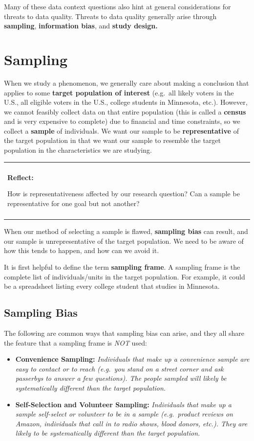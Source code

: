 \documentclass[
]{book}
\newenvironment{reflect}
{
    \begin{center}
    
    \begin{tabular}{|p{0.8\textwidth}|}
    \rowcolor{LightBlue}
    \hline\\
    \rowcolor{LightBlue}
    \textbf{Reflect:}
}
{
    \\\rowcolor{LightBlue}
    \\\hline
    \end{tabular} 
    \end{center}
}
\begin{document}
Many of these data context questions also hint at general considerations for threats to data quality. Threats to data quality generally arise through \textbf{sampling}, \textbf{information bias}, and \textbf{study design.}

\hypertarget{sampling}{%
\section{Sampling}\label{sampling}}

When we study a phenomenon, we generally care about making a conclusion that applies to some \textbf{target population of interest} (e.g.~all likely voters in the U.S., all eligible voters in the U.S., college students in Minnesota, etc.). However, we cannot feasibly collect data on that entire population (this is called a \textbf{census} and is very expensive to complete) due to financial and time constraints, so we collect a \textbf{sample} of individuals. We want our sample to be \textbf{representative} of the target population in that we want our sample to resemble the target population in the characteristics we are studying.

\begin{reflect}
How is representativeness affected by our research question? Can a
sample be representative for one goal but not another?
\end{reflect}

When our method of selecting a sample is flawed, \textbf{sampling bias} can result, and our sample is unrepresentative of the target population. We need to be aware of how this tends to happen, and how can we avoid it.

It is first helpful to define the term \textbf{sampling frame}. A sampling frame is the complete list of individuals/units in the target population. For example, it could be a spreadsheet listing every college student that studies in Minnesota.

\hypertarget{sampling-bias}{%
\subsection{Sampling Bias}\label{sampling-bias}}

The following are common ways that sampling bias can arise, and they all share the feature that a sampling frame is \emph{NOT} used:

\begin{itemize}
\item
  \textbf{Convenience Sampling:} \emph{Individuals that make up a convenience sample are easy to contact or to reach (e.g.~you stand on a street corner and ask passerbys to answer a few questions). The people sampled will likely be systematically different than the target population.}
\item
  \textbf{Self-Selection and Volunteer Sampling:} \emph{Individuals that make up a sample self-select or volunteer to be in a sample (e.g.~product reviews on Amazon, individuals that call in to radio shows, blood donors, etc.). They are likely to be systematically different than the target population.}
\end{itemize}
\end{document}
